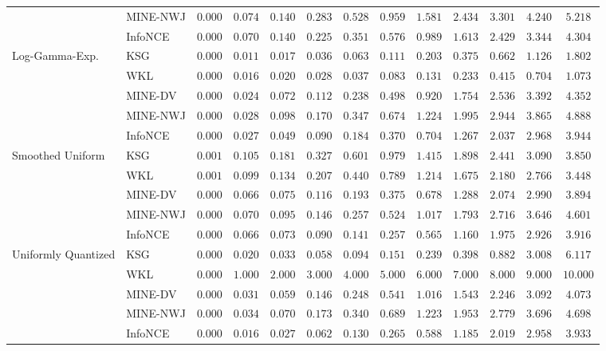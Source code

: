 \begin{tabular}{llccccccccccc}
 & MINE-NWJ & $ 0.000 $ & $ 0.074 $ & $ 0.140 $ & $ 0.283 $ & $ 0.528 $ & $ 0.959 $ & $ 1.581 $ & $ 2.434 $ & $ 3.301 $ & $ 4.240 $ & $ 5.218 $ \\
 & InfoNCE & $ 0.000 $ & $ 0.070 $ & $ 0.140 $ & $ 0.225 $ & $ 0.351 $ & $ 0.576 $ & $ 0.989 $ & $ 1.613 $ & $ 2.429 $ & $ 3.344 $ & $ 4.304 $ \\
\cmidrule{1-13}
\multirow[l]{5}{*}{Log-Gamma-Exp.} & KSG & $ 0.000 $ & $ 0.011 $ & $ 0.017 $ & $ 0.036 $ & $ 0.063 $ & $ 0.111 $ & $ 0.203 $ & $ 0.375 $ & $ 0.662 $ & $ 1.126 $ & $ 1.802 $ \\
 & WKL & $ 0.000 $ & $ 0.016 $ & $ 0.020 $ & $ 0.028 $ & $ 0.037 $ & $ 0.083 $ & $ 0.131 $ & $ 0.233 $ & $ 0.415 $ & $ 0.704 $ & $ 1.073 $ \\
 & MINE-DV & $ 0.000 $ & $ 0.024 $ & $ 0.072 $ & $ 0.112 $ & $ 0.238 $ & $ 0.498 $ & $ 0.920 $ & $ 1.754 $ & $ 2.536 $ & $ 3.392 $ & $ 4.352 $ \\
 & MINE-NWJ & $ 0.000 $ & $ 0.028 $ & $ 0.098 $ & $ 0.170 $ & $ 0.347 $ & $ 0.674 $ & $ 1.224 $ & $ 1.995 $ & $ 2.944 $ & $ 3.865 $ & $ 4.888 $ \\
 & InfoNCE & $ 0.000 $ & $ 0.027 $ & $ 0.049 $ & $ 0.090 $ & $ 0.184 $ & $ 0.370 $ & $ 0.704 $ & $ 1.267 $ & $ 2.037 $ & $ 2.968 $ & $ 3.944 $ \\
\cmidrule{1-13}
\multirow[l]{5}{*}{Smoothed Uniform} & KSG & $ 0.001 $ & $ 0.105 $ & $ 0.181 $ & $ 0.327 $ & $ 0.601 $ & $ 0.979 $ & $ 1.415 $ & $ 1.898 $ & $ 2.441 $ & $ 3.090 $ & $ 3.850 $ \\
 & WKL & $ 0.001 $ & $ 0.099 $ & $ 0.134 $ & $ 0.207 $ & $ 0.440 $ & $ 0.789 $ & $ 1.214 $ & $ 1.675 $ & $ 2.180 $ & $ 2.766 $ & $ 3.448 $ \\
 & MINE-DV & $ 0.000 $ & $ 0.066 $ & $ 0.075 $ & $ 0.116 $ & $ 0.193 $ & $ 0.375 $ & $ 0.678 $ & $ 1.288 $ & $ 2.074 $ & $ 2.990 $ & $ 3.894 $ \\
 & MINE-NWJ & $ 0.000 $ & $ 0.070 $ & $ 0.095 $ & $ 0.146 $ & $ 0.257 $ & $ 0.524 $ & $ 1.017 $ & $ 1.793 $ & $ 2.716 $ & $ 3.646 $ & $ 4.601 $ \\
 & InfoNCE & $ 0.000 $ & $ 0.066 $ & $ 0.073 $ & $ 0.090 $ & $ 0.141 $ & $ 0.257 $ & $ 0.565 $ & $ 1.160 $ & $ 1.975 $ & $ 2.926 $ & $ 3.916 $ \\
\cmidrule{1-13}
\multirow[l]{5}{*}{Uniformly Quantized} & KSG & $ 0.000 $ & $ 0.020 $ & $ 0.033 $ & $ 0.058 $ & $ 0.094 $ & $ 0.151 $ & $ 0.239 $ & $ 0.398 $ & $ 0.882 $ & $ 3.008 $ & $ 6.117 $ \\
 & WKL & $ 0.000 $ & $ 1.000 $ & $ 2.000 $ & $ 3.000 $ & $ 4.000 $ & $ 5.000 $ & $ 6.000 $ & $ 7.000 $ & $ 8.000 $ & $ 9.000 $ & $ 10.000 $ \\
 & MINE-DV & $ 0.000 $ & $ 0.031 $ & $ 0.059 $ & $ 0.146 $ & $ 0.248 $ & $ 0.541 $ & $ 1.016 $ & $ 1.543 $ & $ 2.246 $ & $ 3.092 $ & $ 4.073 $ \\
 & MINE-NWJ & $ 0.000 $ & $ 0.034 $ & $ 0.070 $ & $ 0.173 $ & $ 0.340 $ & $ 0.689 $ & $ 1.223 $ & $ 1.953 $ & $ 2.779 $ & $ 3.696 $ & $ 4.698 $ \\
 & InfoNCE & $ 0.000 $ & $ 0.016 $ & $ 0.027 $ & $ 0.062 $ & $ 0.130 $ & $ 0.265 $ & $ 0.588 $ & $ 1.185 $ & $ 2.019 $ & $ 2.958 $ & $ 3.933 $ \\
\bottomrule
\end{tabular}
